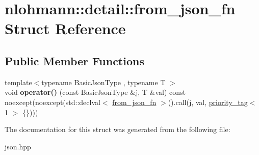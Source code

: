 \hypertarget{structnlohmann_1_1detail_1_1from__json__fn}{}\section{nlohmann\+:\+:detail\+:\+:from\+\_\+json\+\_\+fn Struct Reference}
\label{structnlohmann_1_1detail_1_1from__json__fn}
\subsection*{Public Member Functions}
\begin{DoxyCompactItemize}
\item 
\mbox{\label{structnlohmann_1_1detail_1_1from__json__fn_a48e82ad9d244fdf249caa970a253e214}} 
{\footnotesize template$<$typename Basic\+Json\+Type , typename T $>$ }\\void {\bfseries operator()} (const Basic\+Json\+Type \&j, T \&val) const noexcept(noexcept(std\+::declval$<$ \hyperlink{structnlohmann_1_1detail_1_1from__json__fn}{from\+\_\+json\+\_\+fn} $>$().call(j, val, \hyperlink{structnlohmann_1_1detail_1_1priority__tag}{priority\+\_\+tag}$<$ 1 $>$ \{\})))
\end{DoxyCompactItemize}


The documentation for this struct was generated from the following file\+:\begin{DoxyCompactItemize}
\item 
json.\+hpp\end{DoxyCompactItemize}
